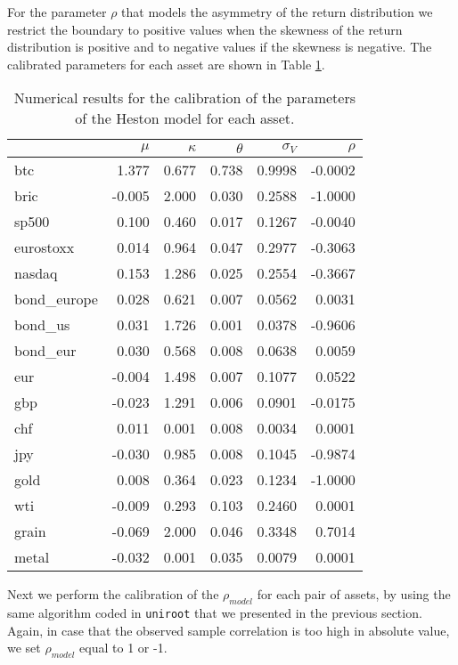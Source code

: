 For the parameter $\rho$ that models the asymmetry of the return distribution we restrict the boundary to positive values when the skewness of the return distribution is positive and to negative values if the skewness is negative. 
The calibrated parameters for each asset are shown in Table \ref{tab:heston_params}.

\begin{table}
	\centering
	\caption{Numerical results for the calibration of the parameters of the Heston model for each asset.}
	\label{tab:heston_params}
	\begin{tabular}{lrrrrr}
		
		& $\mu$ & $\kappa$ & $\theta$ & $\sigma_V$ & $\rho$ \\
		\midrule
		btc & 1.377 & 0.677 & 0.738 & 0.9998 & -0.0002 \\
		bric & -0.005 & 2.000 & 0.030 & 0.2588 & -1.0000 \\
		sp500 & 0.100 & 0.460 & 0.017 & 0.1267 & -0.0040 \\
		eurostoxx & 0.014 & 0.964 & 0.047 & 0.2977 & -0.3063 \\
		nasdaq & 0.153 & 1.286 & 0.025 & 0.2554 & -0.3667 \\
		bond\_europe & 0.028 & 0.621 & 0.007 & 0.0562 & 0.0031 \\
		bond\_us & 0.031 & 1.726 & 0.001 & 0.0378 & -0.9606 \\
		bond\_eur & 0.030 & 0.568 & 0.008 & 0.0638 & 0.0059 \\
		eur & -0.004 & 1.498 & 0.007 & 0.1077 & 0.0522 \\
		gbp & -0.023 & 1.291 & 0.006 & 0.0901 & -0.0175 \\
		chf & 0.011 & 0.001 & 0.008 & 0.0034 & 0.0001 \\
		jpy & -0.030 & 0.985 & 0.008 & 0.1045 & -0.9874 \\
		gold & 0.008 & 0.364 & 0.023 & 0.1234 & -1.0000 \\
		wti & -0.009 & 0.293 & 0.103 & 0.2460 & 0.0001 \\
		grain & -0.069 & 2.000 & 0.046 & 0.3348 & 0.7014 \\
		metal & -0.032 & 0.001 & 0.035 & 0.0079 & 0.0001 \\
		\midrule
	\end{tabular}
\end{table}


Next we perform the calibration of the  $\rho_{model}$ for each pair of assets, by using the same algorithm coded in \texttt{uniroot} that we presented  in the  previous section. Again, in case that the observed sample correlation is too high in absolute value, we set $\rho_{model}$ equal to 1 or -1.

